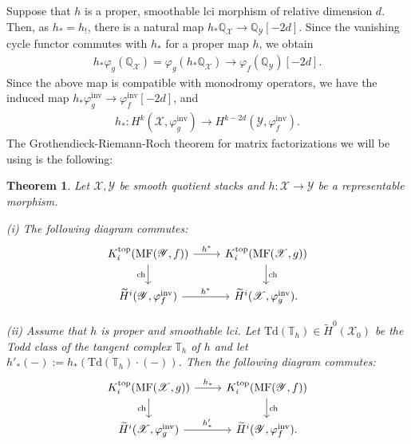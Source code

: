 \documentclass [11pt,oneside,a4paper,mathscr]{amsart}
\newtheorem{thm}{Theorem}[section]
\theoremstyle{definition}
\newcommand{\X}{\mathscr{X}}
\begin{document}
Suppose that $h$ is a proper, smoothable lci morphism of relative dimension $d$. Then, as $h_{*}=h_{!}$, there is a natural map $h_{*}\mathbb{Q}_{\X} \to \mathbb{Q}_{\mathscr{Y}}[-2d]$. 
Since the vanishing cycle functor commutes with $h_{*}$ for 
a proper map $h$, we obtain 
\begin{align*}
    h_{*}\varphi_g(\mathbb{Q}_{\X})=\varphi_g(h_{*}\mathbb{Q}_{\X}) \to\varphi_f(\mathbb{Q}_{\mathscr{Y}})[-2d].
\end{align*}
Since the above map is compatible with monodromy operators, 
we have the induced map $h_{*}\varphi_g^{\mathrm{inv}} \to \varphi_f^{\mathrm{inv}}[-2d]$, and 
\begin{align*}
    h_{*} \colon H^k(\X, \varphi_g^{\mathrm{inv}}) \to H^{k-2d}(\mathscr{Y}, \varphi_f^{\mathrm{inv}}). 
\end{align*}
The Grothendieck-Riemann-Roch theorem for matrix factorizations we will be using is the following: 
\begin{thm}\label{GRRMFtop}  
Let $\X, \mathscr{Y}$ be smooth quotient stacks and $h\colon \X \to \mathscr{Y}$ be a representable morphism. 

(i) The following diagram commutes:
\begin{equation*}
    \begin{tikzcd}
        K^{\mathrm{top}}_i(\mathrm{MF}(\mathscr{Y}, f))\arrow[d, "\mathrm{ch}"']\arrow[r, "h^*"]& K^{\mathrm{top}}_i(\mathrm{MF}(\mathscr{X}, g))\arrow[d, "\mathrm{ch}"]\\
        \widetilde{H}^i(\mathscr{Y}, \varphi^{\mathrm{inv}}_f)\arrow[r, "h^*"]& \widetilde{H}^i(\mathscr{X}, \varphi^{\mathrm{inv}}_g).
    \end{tikzcd}
    \end{equation*}

(ii) Assume that $h$ is proper and smoothable lci. Let 
$\mathrm{Td}(\mathbb{T}_h)\in \widetilde{H}^0(\X_0)$ be the Todd class 
    of the tangent complex $\mathbb{T}_h$ of $h$ and let $h'_*(-):=h_*(\mathrm{Td}(\mathbb{T}_h)\cdot(-))$. 
Then
the following diagram commutes:
\begin{equation*}
    \begin{tikzcd}
        K^{\mathrm{top}}_i(\mathrm{MF}(\X, g))\arrow[d, "\mathrm{ch}"']\arrow[r, "h_*"]& K^{\mathrm{top}}_i(\mathrm{MF}(\mathscr{Y}, f))\arrow[d, "\mathrm{ch}"]\\
        \widetilde{H}^i(\X, \varphi^{\mathrm{inv}}_g)\arrow[r, "h'_*"]& \widetilde{H}^i(\mathscr{Y}, \varphi^{\mathrm{inv}}_f).
    \end{tikzcd}
    \end{equation*}
\end{thm}
\end{document}
